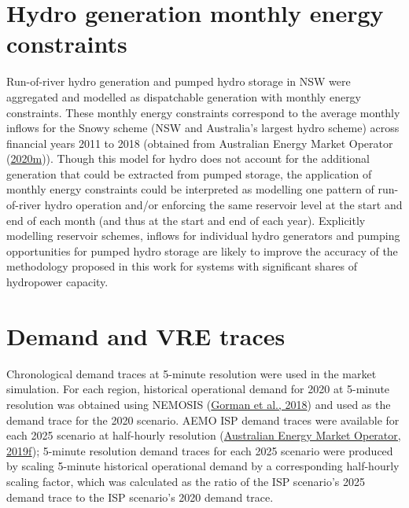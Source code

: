 \documentclass[12pt,a4paper,]{report}
\begin{document}
\hypertarget{hydro-generation-monthly-energy-constraints}{%
\section{Hydro generation monthly energy
constraints}\label{hydro-generation-monthly-energy-constraints}}

Run-of-river hydro generation and pumped hydro storage in NSW were
aggregated and modelled as dispatchable generation with monthly energy
constraints. These monthly energy constraints correspond to the average
monthly inflows for the Snowy scheme (NSW and Australia's largest hydro
scheme) across financial years 2011 to 2018 (obtained from Australian
Energy Market Operator
(\protect\hyperlink{ref-australianenergymarketoperator2020InputsAssumptions2020}{2020m})).
Though this model for hydro does not account for the additional
generation that could be extracted from pumped storage, the application
of monthly energy constraints could be interpreted as modelling one
pattern of run-of-river hydro operation and/or enforcing the same
reservoir level at the start and end of each month (and thus at the
start and end of each year). Explicitly modelling reservoir schemes,
inflows for individual hydro generators and pumping opportunities for
pumped hydro storage are likely to improve the accuracy of the
methodology proposed in this work for systems with significant shares of
hydropower capacity.

\hypertarget{demand-and-vre-traces}{%
\section{Demand and VRE traces}\label{demand-and-vre-traces}}

Chronological demand traces at 5-minute resolution were used in the
market simulation. For each region, historical operational demand for
2020 at 5-minute resolution was obtained using NEMOSIS
(\protect\hyperlink{ref-gormanNEMOSISNEMOpen2018}{Gorman et al., 2018})
and used as the demand trace for the 2020 scenario. AEMO ISP demand
traces were available for each 2025 scenario at half-hourly resolution
(\protect\hyperlink{ref-australianenergymarketoperator2020DraftISP2019a}{Australian
Energy Market Operator, 2019f}); 5-minute resolution demand traces for
each 2025 scenario were produced by scaling 5-minute historical
operational demand by a corresponding half-hourly scaling factor, which
was calculated as the ratio of the ISP scenario's 2025 demand trace to
the ISP scenario's 2020 demand trace.
\end{document}
